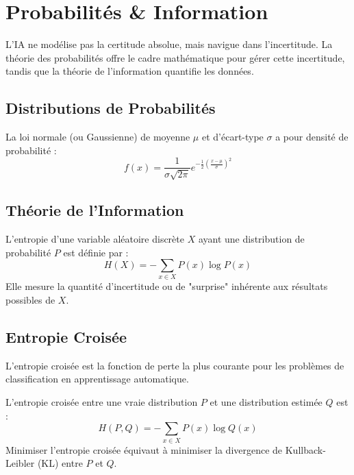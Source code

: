 \chapter{Probabilités \& Information}

L'IA ne modélise pas la certitude absolue, mais navigue dans l'incertitude. La théorie des probabilités offre le cadre mathématique pour gérer cette incertitude, tandis que la théorie de l'information quantifie les données.

\section{Distributions de Probabilités}

\begin{definition}
La loi normale (ou Gaussienne) de moyenne $\mu$ et d'écart-type $\sigma$ a pour densité de probabilité :
$$ f(x) = \frac{1}{\sigma\sqrt{2\pi}} e^{-\frac{1}{2}\left(\frac{x-\mu}{\sigma}\right)^2} $$
\end{definition}

\section{Théorie de l'Information}

\begin{definition}
L'entropie d'une variable aléatoire discrète $X$ ayant une distribution de probabilité $P$ est définie par :
$$ H(X) = - \sum_{x \in X} P(x) \log P(x) $$
Elle mesure la quantité d'incertitude ou de "surprise" inhérente aux résultats possibles de $X$.
\end{definition}

\section{Entropie Croisée}

L'entropie croisée est la fonction de perte la plus courante pour les problèmes de classification en apprentissage automatique.

\begin{definition}
L'entropie croisée entre une vraie distribution $P$ et une distribution estimée $Q$ est :
$$ H(P, Q) = - \sum_{x \in X} P(x) \log Q(x) $$
Minimiser l'entropie croisée équivaut à minimiser la divergence de Kullback-Leibler (KL) entre $P$ et $Q$.
\end{definition}
